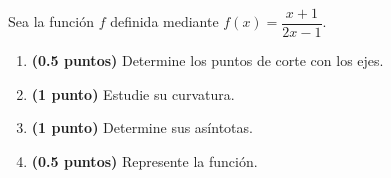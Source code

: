 
Sea la función $f$ definida mediante $f(x)=\dfrac{x+1}{2x-1}$.
\begin{enumerate}[label=\alph*)]
\item \textbf{(0.5 puntos)} Determine los puntos de corte con los ejes.
\item \textbf{(1 punto)} Estudie su curvatura.
\item \textbf{(1 punto)} Determine sus asíntotas.
\item \textbf{(0.5 puntos)} Represente la función.
\end{enumerate}

